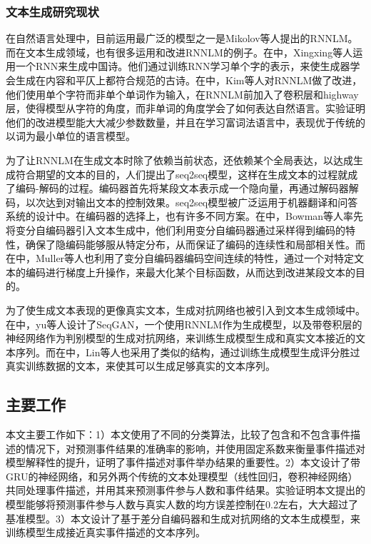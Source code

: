 \subsubsection{文本生成研究现状}
在自然语言处理中，目前运用最广泛的模型之一是Mikolov等人提出的RNNLM。而在文本生成领域，也有很多运用和改进RNNLM的例子。在中，Xingxing等人运用一个RNN来生成中国诗。他们通过训练RNN学习单个字的表示，来使生成器学会生成在内容和平仄上都符合规范的古诗。在中，Kim等人对RNNLM做了改进，他们使用单个字符而非单个单词作为输入，在RNNLM前加入了卷积层和highway层，使得模型从字符的角度，而非单词的角度学会了如何表达自然语言。实验证明他们的改进模型能大大减少参数数量，并且在学习富词法语言中，表现优于传统的以词为最小单位的语言模型。

为了让RNNLM在生成文本时除了依赖当前状态，还依赖某个全局表达，以达成生成符合期望的文本的目的，人们提出了seq2seq模型，这样在生成文本的过程就成了编码-解码的过程。编码器首先将某段文本表示成一个隐向量，再通过解码器解码，以次达到对输出文本的控制效果。seq2seq模型被广泛运用于机器翻译和问答系统的设计中。在编码器的选择上，也有许多不同方案。在中，Bowman等人率先将变分自编码器引入文本生成中，他们利用变分自编码器通过采样得到编码的特性，确保了隐编码能够服从特定分布，从而保证了编码的连续性和局部相关性。而在中，Muller等人也利用了变分自编码器编码空间连续的特性，通过一个对特定文本的编码进行梯度上升操作，来最大化某个目标函数，从而达到改进某段文本的目的。

为了使生成文本表现的更像真实文本，生成对抗网络也被引入到文本生成领域中。在中，yu等人设计了SeqGAN，一个使用RNNLM作为生成模型，以及带卷积层的神经网络作为判别模型的生成对抗网络，来训练生成模型生成和真实文本接近的文本序列。而在中，Lin等人也采用了类似的结构，通过训练生成模型生成评分胜过真实训练数据的文本，来使其可以生成足够真实的文本序列。

\subsection{主要工作}
本文主要工作如下：1）本文使用了不同的分类算法，比较了包含和不包含事件描述的情况下，对预测事件结果的准确率的影响，并使用固定系数来衡量事件描述对模型解释性的提升，证明了事件描述对事件举办结果的重要性。2）本文设计了带GRU的神经网络，和另外两个传统的文本处理模型（线性回归，卷积神经网络）共同处理事件描述，并用其来预测事件参与人数和事件结果。实验证明本文提出的模型能够将预测事件参与人数与真实人数的均方误差控制在0.2左右，大大超过了基准模型。3）本文设计了基于差分自编码器和生成对抗网络的文本生成模型，来训练模型生成接近真实事件描述的文本序列。
